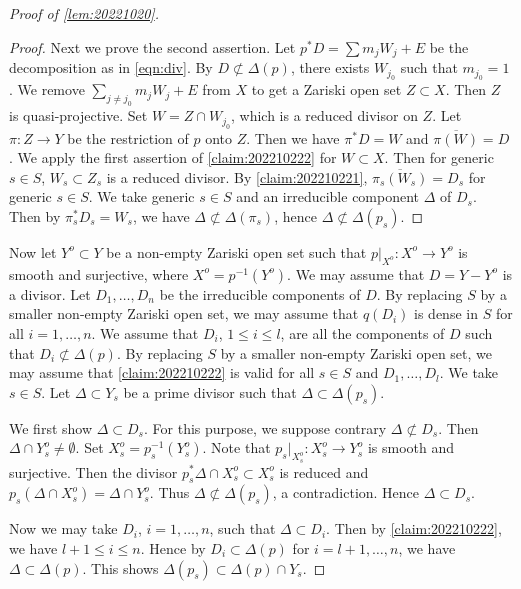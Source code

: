 \documentclass[11pt,english]{smfart}
\theoremstyle{plain}
\theoremstyle{definition}
\theoremstyle{remark}
\numberwithin{equation}{subsection}
\theoremstyle{plain}
\begin{document}
\begin{proof}[Proof of \cref{lem:20221020}]
\begin{proof}
Next we prove the second assertion.
Let $p^*D=\sum m_jW_j+E$ be the decomposition as in \eqref{eqn:div}.
By $D\not\subset \Delta(p)$, there exists $W_{j_0}$ such that $m_{j_0}=1$.
We remove $\sum_{j\not=j_0} m_jW_j+E$ from $X$ to get a Zariski open set $Z\subset X$.
Then $Z$ is quasi-projective.
Set $W=Z\cap W_{j_0}$, which is a reduced divisor on $Z$.
Let $\pi:Z\to Y$ be the restriction of $p$ onto $Z$.
Then we have $\pi^*D=W$ and $\overline{\pi(W)}=D$.
We apply the first assertion of \cref{claim:202210222} for $W\subset X$.
Then for generic $s\in S$, $W_s\subset Z_s$ is a reduced divisor.
By \cref{claim:202210221}, $\overline{\pi_s(W_s)}=D_s$ for generic $s\in S$.
We take generic $s\in S$ and an irreducible component $\Delta$ of $D_s$.
Then by $\pi_s^*D_s=W_s$, we have $\Delta\not\subset \Delta(\pi_s)$, hence $\Delta\not\subset \Delta(p_s)$.
\end{proof}


Now let $Y^o\subset Y$ be a non-empty Zariski open set such that $p|_{X^o}:X^o\to Y^o$ is smooth and surjective, where $X^o=p^{-1}(Y^o)$.
We may assume that $D=Y-Y^o$ is a divisor.
Let $D_1,\ldots,D_n$ be the irreducible components of $D$.
By replacing $S$ by a smaller non-empty Zariski open set, we may assume that $q(D_i)$ is dense in $S$ for all $i=1,\ldots,n$.
We assume that $D_i$, $1\leq i\leq l$, are all the components of $D$ such that $D_i\not\subset \Delta(p)$.
By replacing $S$ by a smaller non-empty Zariski open set, we may assume that \cref{claim:202210222} is valid for all $s\in S$ and $D_{1},\ldots,D_l$.
We take $s\in S$.
Let $\Delta\subset Y_s$ be a prime divisor such that $\Delta\subset \Delta(p_s)$.

We first show $\Delta\subset D_s$.
For this purpose, we suppose contrary $\Delta\not\subset D_s$.
Then $\Delta\cap Y^o_s\not=\emptyset$.
Set $X^o_s=p_s^{-1}(Y^o_s)$.
Note that $p_s|_{X^o_s}:X^o_s\to Y^o_s$ is smooth and surjective.
Then the divisor $p_s^*\Delta\cap X^o_s\subset X^o_s$ is reduced and $p_s(\Delta\cap X^o_s)=\Delta\cap Y^o_s$.
Thus $\Delta\not\subset \Delta(p_s)$, a contradiction.
Hence $\Delta\subset D_s$.

Now we may take $D_i$, $i=1,\ldots,n$, such that $\Delta\subset D_i$.
Then by \cref{claim:202210222}, we have $l+1\leq i\leq n$.
Hence by $D_i\subset \Delta(p)$ for $i=l+1,\ldots,n$, we have $\Delta\subset \Delta(p)$.
This shows $\Delta(p_s)\subset \Delta(p)\cap Y_s$.
\end{proof}
\end{document}

